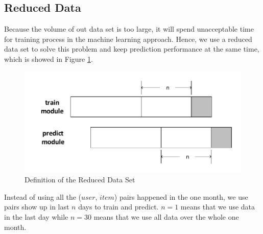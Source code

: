 \documentclass{llncs}
\begin{document}

\subsection{Reduced Data}
Because the volume of out data set is too large,
it will spend unacceptable time for training process
in the machine learning approach.
Hence, we use a reduced data set to solve this problem
and keep prediction performance at the same time,
which is showed in Figure \ref{fig:reduced_data_set}.

\begin{figure}[htbp]
	\centering
	\includegraphics[scale=0.5]{images/reduced_data_set.pdf}
	\caption{Definition of the Reduced Data Set}
	\label{fig:reduced_data_set}
\end{figure}

Instead of using all the ($user$, $item$) pairs happened in the one month,
we use pairs show up in last $n$ days to train and predict.
$n = 1$ means that we use data in the last day while
$n = 30$ means that we use all data over the whole one month.

\end{document}
